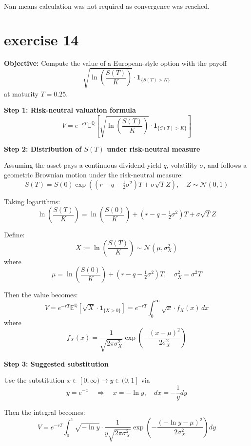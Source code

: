 \documentclass{article}
\begin{document}
Nan means calculation was not required as convergence was reached.
\section{exercise 14}

\textbf{Objective:} Compute the value of a European-style option with the payoff
\[
    \sqrt{\ln\left(\frac{S(T)}{K}\right)} \cdot \mathbf{1}_{\{S(T) > K\}}
\]
at maturity \( T = 0.25 \).

\vspace{1em}

\textbf{Step 1: Risk-neutral valuation formula}
\[
    V = e^{-rT} \mathbb{E}^{\mathbb{Q}}\left[\sqrt{\ln\left(\frac{S(T)}{K}\right)} \cdot \mathbf{1}_{\{S(T) > K\}} \right]
\]

\vspace{1em}

\textbf{Step 2: Distribution of \( S(T) \) under risk-neutral measure}

Assuming the asset pays a continuous dividend yield \( q \), volatility \( \sigma \), and follows a geometric Brownian motion under the risk-neutral measure:
\[
    S(T) = S(0) \exp\left((r - q - \tfrac{1}{2}\sigma^2)T + \sigma \sqrt{T} Z\right), \quad Z \sim \mathcal{N}(0, 1)
\]

Taking logarithms:
\[
    \ln\left(\frac{S(T)}{K}\right) = \ln\left(\frac{S(0)}{K}\right) + (r - q - \tfrac{1}{2}\sigma^2)T + \sigma \sqrt{T} Z
\]

Define:
\[
    X := \ln\left(\frac{S(T)}{K}\right) \sim \mathcal{N}(\mu, \sigma_X^2)
\]
where
\[
    \mu = \ln\left(\frac{S(0)}{K}\right) + (r - q - \tfrac{1}{2}\sigma^2)T,\quad \sigma_X^2 = \sigma^2 T
\]

Then the value becomes:
\[
    V = e^{-rT} \mathbb{E}^{\mathbb{Q}}\left[\sqrt{X} \cdot \mathbf{1}_{\{X > 0\}} \right]
    = e^{-rT} \int_0^{\infty} \sqrt{x} \cdot f_X(x) \, dx
\]
where
\[
    f_X(x) = \frac{1}{\sqrt{2\pi \sigma_X^2}} \exp\left( -\frac{(x - \mu)^2}{2 \sigma_X^2} \right)
\]

\vspace{1em}

\textbf{Step 3: Suggested substitution}

Use the substitution \( x \in [0, \infty) \rightarrow y \in (0, 1] \) via
\[
    y = e^{-x} \quad \Rightarrow \quad x = -\ln y, \quad dx = -\frac{1}{y} dy
\]

Then the integral becomes:
\[
    V = e^{-rT} \int_0^1 \sqrt{-\ln y} \cdot \frac{1}{y \sqrt{2\pi \sigma_X^2}}
    \exp\left( -\frac{(-\ln y - \mu)^2}{2\sigma_X^2} \right) dy
\]
\end{document}
